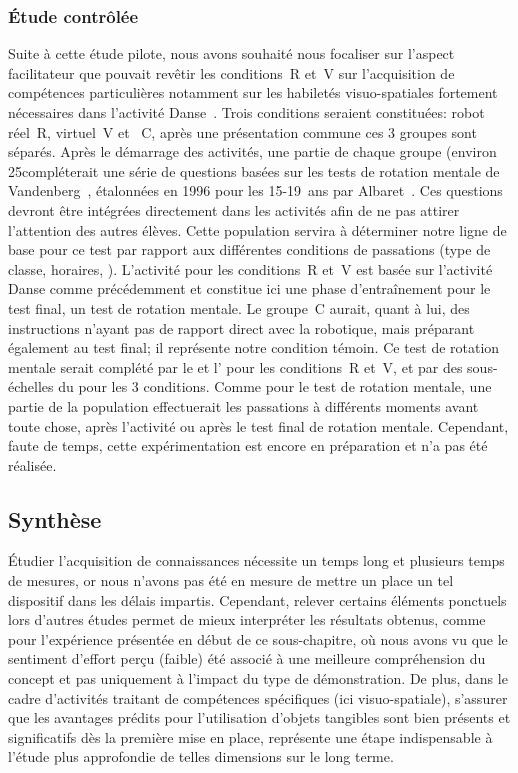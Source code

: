         \subsubsection{Étude contrôlée}\label{Exp:Reel_virtuel-control}
                Suite à cette étude pilote, nous avons souhaité nous focaliser sur l'aspect facilitateur que pouvait revêtir les conditions~R et~V sur l'acquisition de compétences particulières notamment sur les habiletés visuo-spatiales fortement nécessaires dans l'activité Danse~. 
                Trois conditions seraient constituées: robot réel~R, virtuel~V et ~C, après une présentation commune  ces 3 groupes sont séparés. Après le démarrage des activités, une partie de chaque groupe (environ 25\prc[)] compléterait une série de questions basées sur les tests de rotation mentale de Vandenberg~, étalonnées en 1996 pour les 15-19~ans par Albaret~. Ces questions devront être intégrées directement dans les activités afin de ne pas attirer l'attention des autres élèves. Cette population servira à déterminer notre ligne de base pour ce test par rapport aux différentes conditions de passations (type de classe, horaires, \etc). 
                L'activité pour les conditions~R et~V est basée sur l'activité Danse comme précédemment et constitue ici une phase d'entraînement pour le test final, un test de rotation mentale. Le groupe~C aurait, quant à lui, des instructions n'ayant pas de rapport direct avec la robotique, mais préparant également au test final; il représente notre condition témoin. 
                Ce test de rotation mentale serait complété par le  et l' pour les conditions~R et~V, et par des sous-échelles du  pour les 3 conditions. Comme pour le test de rotation mentale, une partie de la population effectuerait les passations à différents moments \ie avant toute chose, après l'activité ou après le test final de rotation mentale.
                Cependant, faute de temps, cette expérimentation est encore en préparation et n'a pas été réalisée.
    \subsection{Synthèse}
        Étudier l'acquisition de connaissances nécessite un temps long et plusieurs temps de mesures, or nous n'avons pas été en mesure de mettre un place un tel dispositif dans les délais impartis. Cependant, relever certains éléments ponctuels lors d'autres études permet de mieux interpréter les résultats obtenus, comme pour l'expérience présentée en début de ce sous-chapitre, où nous avons vu que le sentiment d'effort perçu (\ie faible) été associé à une meilleure compréhension du concept et pas uniquement à l'impact du type de démonstration. De plus, dans le cadre d'activités traitant de compétences spécifiques (ici visuo-spatiale), s'assurer que les avantages prédits pour l'utilisation d'objets tangibles sont bien présents et significatifs dès la première mise en place, représente une étape indispensable à l'étude plus approfondie de telles dimensions sur le long terme. 